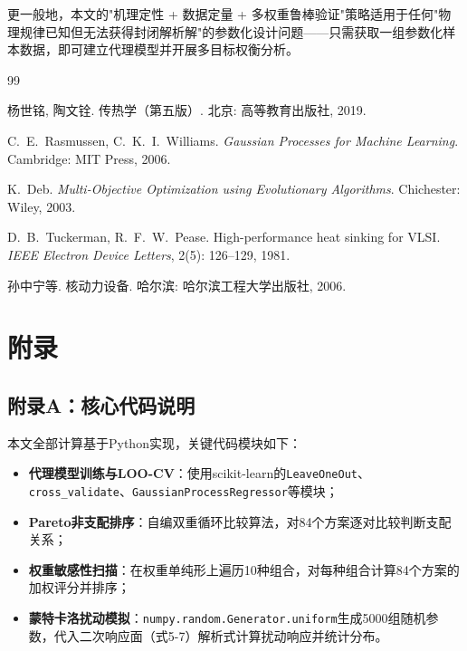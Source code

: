 \documentclass[12pt,a4paper]{ctexart}
\begin{document}
更一般地，本文的"机理定性 + 数据定量 + 多权重鲁棒验证"策略适用于任何"物理规律已知但无法获得封闭解析解"的参数化设计问题——只需获取一组参数化样本数据，即可建立代理模型并开展多目标权衡分析。

\begin{thebibliography}{99}

 杨世铭, 陶文铨. 传热学（第五版）. 北京: 高等教育出版社, 2019.

 C.~E.~Rasmussen, C.~K.~I.~Williams. \textit{Gaussian Processes for Machine Learning}. Cambridge: MIT Press, 2006.

 K.~Deb. \textit{Multi-Objective Optimization using Evolutionary Algorithms}. Chichester: Wiley, 2003.

 D.~B.~Tuckerman, R.~F.~W.~Pease. High-performance heat sinking for VLSI. \textit{IEEE Electron Device Letters}, 2(5): 126--129, 1981.

 孙中宁等. 核动力设备. 哈尔滨: 哈尔滨工程大学出版社, 2006.

\end{thebibliography}

\newpage
\section*{附录}


\subsection*{附录A：核心代码说明}

本文全部计算基于Python实现，关键代码模块如下：

\begin{itemize}
\item \textbf{代理模型训练与LOO-CV}：使用scikit-learn的\texttt{LeaveOneOut}、\texttt{cross\_validate}、\texttt{GaussianProcessRegressor}等模块；
\item \textbf{Pareto非支配排序}：自编双重循环比较算法，对84个方案逐对比较判断支配关系；
\item \textbf{权重敏感性扫描}：在权重单纯形上遍历10种组合，对每种组合计算84个方案的加权评分并排序；
\item \textbf{蒙特卡洛扰动模拟}：\texttt{numpy.random.Generator.uniform}生成5000组随机参数，代入二次响应面（式5-7）解析式计算扰动响应并统计分布。
\end{itemize}
\end{document}
